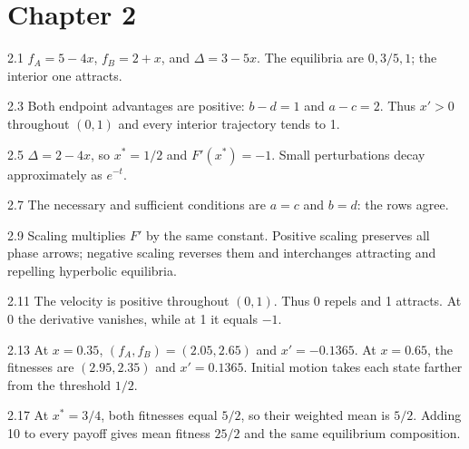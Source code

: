 \documentclass[11pt,oneside,openany]{book}
\theoremstyle{definition}
\theoremstyle{remark}
\newenvironment{answers}{\begin{description}[leftmargin=2.9em,labelwidth=2.5em,labelsep=.4em,itemsep=8pt,font=\normalfont\bfseries]}{\end{description}}
\numberwithin{equation}{chapter}
\begin{document}
\section*{Chapter 2}
\begin{answers}
\item[2.1] $f_A=5-4x$, $f_B=2+x$, and $\Delta=3-5x$. The equilibria are $0,3/5,1$; the interior one attracts.
\item[2.3] Both endpoint advantages are positive: $b-d=1$ and $a-c=2$. Thus $x'>0$ throughout $(0,1)$ and every interior trajectory tends to 1.
\item[2.5] $\Delta=2-4x$, so $x^*=1/2$ and $F'(x^*)=-1$. Small perturbations decay approximately as $e^{-t}$.
\item[2.7] The necessary and sufficient conditions are $a=c$ and $b=d$: the rows agree.
\item[2.9] Scaling multiplies $F'$ by the same constant. Positive scaling preserves all phase arrows; negative scaling reverses them and interchanges attracting and repelling hyperbolic equilibria.
\item[2.11] The velocity is positive throughout $(0,1)$. Thus 0 repels and 1 attracts. At 0 the derivative vanishes, while at 1 it equals $-1$.
\item[2.13] At $x=0.35$, $(f_A,f_B)=(2.05,2.65)$ and $x'=-0.1365$. At $x=0.65$, the fitnesses are $(2.95,2.35)$ and $x'=0.1365$. Initial motion takes each state farther from the threshold $1/2$.
\item[2.17] At $x^*=3/4$, both fitnesses equal $5/2$, so their weighted mean is $5/2$. Adding 10 to every payoff gives mean fitness $25/2$ and the same equilibrium composition.
\end{answers}
\end{document}
